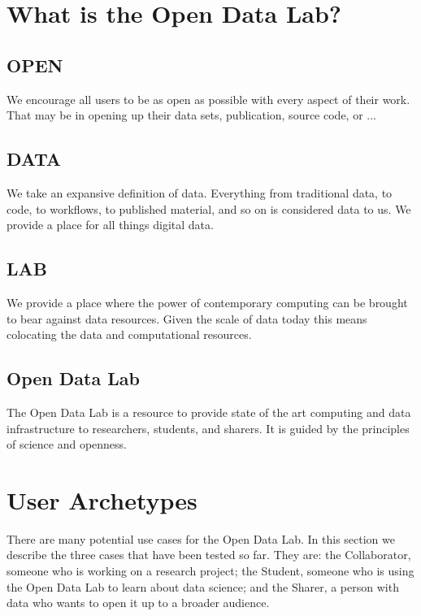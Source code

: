 \section{What is the Open Data Lab?}
\subsection*{OPEN}
We encourage all users to be as open as possible with every aspect of their work. That may be in opening up their data sets, publication, source code, or ...
\subsection*{DATA}
We take an expansive definition of data. Everything from traditional data, to code, to workflows, to published material, and so on is considered data to us. We provide a place for all things digital data.
\subsection*{LAB}
We provide a place where the power of contemporary computing can be brought to bear against data resources. Given the scale of data today this means colocating the data and computational resources.
\subsection*{Open Data Lab}
The Open Data Lab is a resource to provide state of the art computing and data infrastructure to researchers, students, and sharers. It is guided by the principles of science and openness.
 
\section{User Archetypes}
There are many potential use cases for the Open Data Lab. In this section we describe the three cases that have been tested so far. They are: the Collaborator, someone who is working on a research project; the Student, someone who is using the Open Data Lab to learn about data science; and the Sharer, a person with data who wants to open it up to a broader audience.

